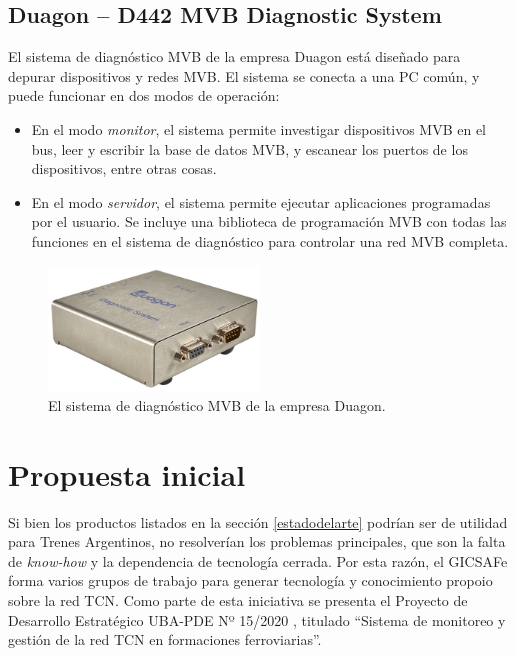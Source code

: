 \subsection{Duagon -- D442 MVB Diagnostic System}

El sistema de diagnóstico MVB de la empresa Duagon \cite{duagon} está diseñado para depurar dispositivos y redes MVB. El sistema se conecta a una PC común, y puede funcionar en dos modos de operación:

\begin{itemize}
\item En el modo \emph{monitor}, el sistema permite investigar dispositivos MVB en el bus, leer y escribir la base de datos MVB, y escanear los puertos de los dispositivos, entre otras cosas.
\item En el modo \emph{servidor}, el sistema permite ejecutar aplicaciones programadas por el usuario. Se incluye una biblioteca de programación MVB con todas las funciones en el sistema de diagnóstico para controlar una red MVB completa.
\end{itemize}

\begin{figure}[htbp]
	\centering
	\includegraphics[width=0.5\textwidth]{./Figures/duagon.png}
	\caption[Duagon -- D442 MVB Diagnostic System]{El sistema de diagnóstico MVB de la empresa Duagon.}
\end{figure}


\section{Propuesta inicial}

Si bien los productos listados en la sección \ref{estadodelarte} podrían ser de utilidad para Trenes Argentinos, no resolverían los problemas principales, que son la falta de \emph{know-how} y la dependencia de tecnología cerrada. Por esta razón, el GICSAFe forma varios grupos de trabajo para generar tecnología y conocimiento propoio sobre la red TCN. Como parte de esta iniciativa se presenta el Proyecto de Desarrollo Estratégico UBA-PDE Nº 15/2020 \cite{pde2020}, titulado ``Sistema de monitoreo y gestión de la red TCN en formaciones ferroviarias''.

